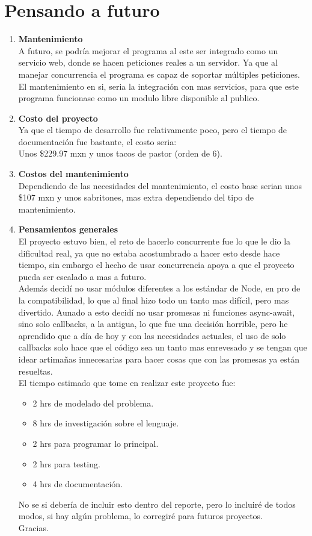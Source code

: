 \documentclass{report}
\begin{document}
\section{Pensando a futuro}

\begin{enumerate}
    \item \textbf{Mantenimiento}\\
        A futuro, se podría mejorar el programa al este ser integrado como un servicio web, donde se hacen peticiones reales a un servidor. Ya que al manejar concurrencia el programa es capaz de soportar múltiples peticiones.
        El mantenimiento en si, seria la integración con mas servicios, para que este programa funcionase como un modulo libre disponible al publico.
    \item \textbf{Costo del proyecto}\\
        Ya que el tiempo de desarrollo fue relativamente poco, pero el tiempo de documentación fue bastante, el costo seria:\\
        Unos \$229.97 mxn y unos tacos de pastor (orden de 6).
    \item \textbf{Costos del mantenimiento}\\
        Dependiendo de las necesidades del mantenimiento, el costo base serian unos \$107 mxn y unos sabritones, mas extra dependiendo del tipo de mantenimiento.
    \item \textbf{Pensamientos generales}\\
        El proyecto estuvo bien, el reto de hacerlo concurrente fue lo que le dio la dificultad real, ya que no estaba acostumbrado a hacer esto desde hace tiempo, sin embargo el hecho de usar concurrencia apoya a que el proyecto pueda ser escalado a mas a futuro.\\
        Además decidí no usar módulos diferentes a los estándar de Node, en pro de la compatibilidad, lo que al final hizo todo un tanto mas difícil, pero mas divertido. Aunado a esto decidí no usar promesas ni funciones async-await, sino solo callbacks, a la antigua, lo que fue una decisión horrible, pero he aprendido que a día de hoy y con las necesidades actuales, el uso de solo callbacks solo hace que el código sea un tanto mas enrevesado y se tengan que idear artimañas innecesarias para hacer cosas que con las promesas ya están resueltas. \\
        El tiempo estimado que tome en realizar este proyecto fue:
        \begin{itemize}
            \item 2 hrs de modelado del problema.
            \item 8 hrs de investigación sobre el lenguaje.
            \item 2 hrs para programar lo principal.
            \item 2 hrs para testing.
            \item 4 hrs de documentación.
        \end{itemize}
        No se si debería de incluir esto dentro del reporte, pero lo incluiré de todos modos, si hay algún problema, lo corregiré para futuros proyectos.\\
        Gracias.
\end{enumerate}
\end{document}

